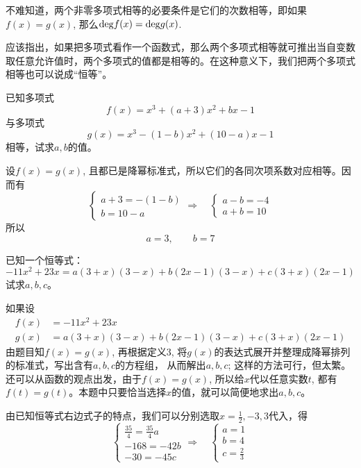 不难知道，两个非零多项式相等的必要条件是它们的次数相等，即如果$f(x)=g(x)$, 那么${\rm deg}f(x)={\rm deg}g(x)$.

应该指出，如果把多项式看作一个函数式，那么两个多项式相等就可推出当自变数取任意允许值时，两个多项式的值都是相等的。在这种意义下，我们把两个多项式相等也可以说成“恒等”。

\begin{example}
已知多项式
\[f (x) =x^3+ (a+3) x^2+bx-1\]
与多项式
\[g (x) =x^3- (1-b) x^2+ (10-a) x-1\]
相等，试求$a,b$的值。    
\end{example}

\begin{solution}
设$f(x)=g(x)$, 且都已是降幂标准式，所以它们的各同次项系数对应相等。因而有    
\[\begin{cases}
    a+3=-(1-b)\\b=10-a
\end{cases}\Rightarrow\quad
\begin{cases}
    a-b=-4\\ a+b=10
\end{cases}\]
所以
\[a=3,\qquad b=7\]
\end{solution}

\begin{example}
已知一个恒等式：
\[-11x^2+23x=a(3+x)(3-x)+b(2x-1)(3-x)+c(3+x)(2x-1)\]
试求$a,b,c$。
\end{example}

\begin{analyze}
如果设
\[\begin{split}
    f(x)&=-11x^2+23x\\
    g(x)&=a(3+x)(3-x)+b(2x-1)(3-x)+c(3+x)(2x-1)
\end{split}\]
由题目知$f(x)=g(x)$, 再根据定义3, 将$g(x)$的表达式展开并整理成降幂排列的标准式，写出含有$a,b,c$的方程组，
从而解出$a,b,c$; 这样的方法可行，但太繁。还可以从函数的观点出发，由于$f(x)=g(x)$, 所以给$x$代以任意实数$t$, 都有$f(t)=g(t)$。本题中只要恰当选择$x$的值，就可以简便地求出$a,b,c$。
\end{analyze}

\begin{solution}
由已知恒等式右边式子的特点，我们可以分别选取$x=\frac{1}{2},-3, 3$代入，得
\[\begin{cases}
    \frac{35}{4}=\frac{35}{4}a\\
    -168=-42b\\
    -30=-45c
\end{cases}\Rightarrow\quad \begin{cases}
    a=1\\b=4\\c=\frac{2}{3}
\end{cases}\]
\end{solution}

